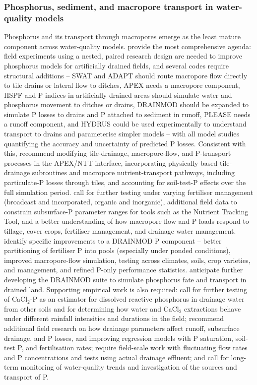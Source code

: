 \documentclass[11pt]{article}
\begin{document}
\subsubsection{Phosphorus, sediment, and macropore transport in water-quality models}

Phosphorus and its transport through macropores emerge as the least mature
component across water-quality models. \textcite{Radcliffe2015} provide the most
comprehensive agenda: field experiments using a nested, paired research design
are needed to improve phosphorus models for artificially drained fields, and
several codes require structural additions -- SWAT and ADAPT should route
macropore flow directly to tile drains or lateral flow to ditches, APEX needs a
macropore component, HSPF and P-indices in artificially drained areas should
simulate water and phosphorus movement to ditches or drains, DRAINMOD should be
expanded to simulate P losses to drains and P attached to sediment in runoff,
PLEASE needs a runoff component, and HYDRUS could be used experimentally to
understand transport to drains and parameterise simpler models -- with all model
studies quantifying the accuracy and uncertainty of predicted P losses.
Consistent with this, \textcite{Guo2020b} recommend modifying tile-drainage,
macropore-flow, and P-transport processes in the APEX/NTT interface, incorporating
physically based tile-drainage subroutines and macropore nutrient-transport
pathways, including particulate-P losses through tiles, and accounting for soil-test-P
effects over the full simulation period. \textcite{Ford2017} call for further
testing under varying fertiliser management (broadcast and incorporated, organic
and inorganic), additional field data to constrain subsurface-P parameter ranges
for tools such as the Nutrient Tracking Tool, and a better understanding of how
macropore flow and P loads respond to tillage, cover crops, fertiliser management,
and drainage water management. \textcite{BinShokrana2023b} identify specific
improvements to a DRAINMOD P component -- better partitioning of fertiliser P into
pools (especially under ponded conditions), improved macropore-flow simulation,
testing across climates, soils, crop varieties, and management, and refined
P-only performance statistics. \textcite{Gowda2012} anticipate further developing
the DRAINMOD suite to simulate phosphorus fate and transport in drained land.
Supporting empirical work is also required: \textcite{McDowell2001b} call for
further testing of CaCl$_2$-P as an estimator for dissolved reactive phosphorus in
drainage water from other soils and for determining how water and CaCl$_2$
extractions behave under different rainfall intensities and durations in the
field; \textcite{Morrison2013} recommend additional field research on how drainage
parameters affect runoff, subsurface drainage, and P losses, and improving
regression models with P saturation, soil-test P, and fertilisation rates;
\textcite{Sanford2016} require field-scale work with fluctuating flow rates and P
concentrations and tests using actual drainage effluent; and \textcite{Jia2012}
call for long-term monitoring of water-quality trends and investigation of the
sources and transport of P.
\end{document}
